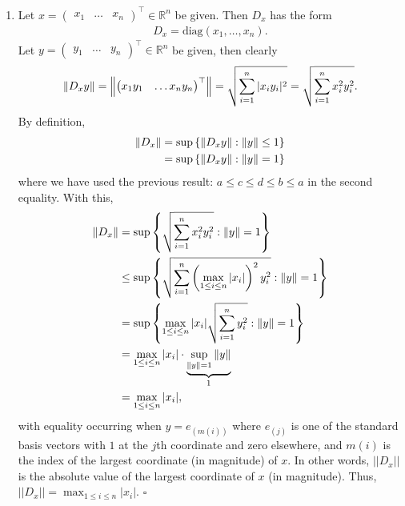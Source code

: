 \documentclass[11pt]{article}
\begin{document}
\begin{enumerate}
	\item  Let ${x} = \begin{pmatrix}
	x_1 & \dots & x_n
	\end{pmatrix}^\top \in \mathbb{R}^n$ be given. Then $D_x$ has the form
	\begin{align*}
	D_x = \text{diag}(x_1,\dots,x_n).
	\end{align*} 
	Let ${y} = \begin{pmatrix}
	y_1 & \dots & y_n
	\end{pmatrix}^\top \in \mathbb{R}^n$ be given, then clearly 
	\begin{align*}
	\norm{ D_xy} = \norm{ \begin{pmatrix}
	x_1 y_1 & \dots x_ny_n
	\end{pmatrix}^\top}= \sqrt{ \sum^n_{i=1}|x_i y_i|^2  }  = \sqrt{\sum^n_{i=1} x_i^2 y_i^2}.
	\end{align*}
	By definition, 
	\begin{align*}
	\norm{ D_x } &= \sup \left\{\norm{ D_x y} : \norm{y} \leq 1 \right\}\nonumber\\
	&= \sup \left\{\norm{D_x y} : \norm{y} = 1\right\}
	\end{align*}
	where we have used the previous result: $a \leq c \leq d \leq b \leq a$ in the second equality. With this,
	\begin{align*}
	\norm{ D_x } &= \sup \left\{\sqrt{\sum^n_{i=1} x_i^2 y_i^2} : \norm{y} = 1\right\}\nonumber\\
	&\leq \sup \left\{ \sqrt{\sum^n_{i=1} \left(\max_{1\leq i \leq n} |x_i|\right)^2  y_i^2} : \norm{y} = 1 \right\}  \nonumber\\
	&= \sup \left\{\max_{1\leq i \leq n} |x_i| \sqrt{\sum^n_{i=1} y_i^2} : \norm{y} = 1 \right\}  \nonumber\\
	&= \max_{1\leq i \leq n} |x_i| \cdot \underbrace{\sup_{\norm{y}=1}\norm{y}}_{1}\nonumber\\
	&= \max_{1\leq i \leq n} |x_i|,
	\end{align*}
	with equality occurring when $y = e_{(m(i))}$ where $e_{(j)}$ is one of the standard basis vectors with $1$ at the $j$th coordinate and zero elsewhere, and $m(i)$ is the index of the largest coordinate (in magnitude) of $x$. In other words, $||D_x||$ is the absolute value of the largest coordinate of $x$ (in magnitude). Thus, $||D_x|| = \max_{1\leq i \leq n}|x_i|$. \hfill $\square$
	
	
	

\end{enumerate}
\end{document}

